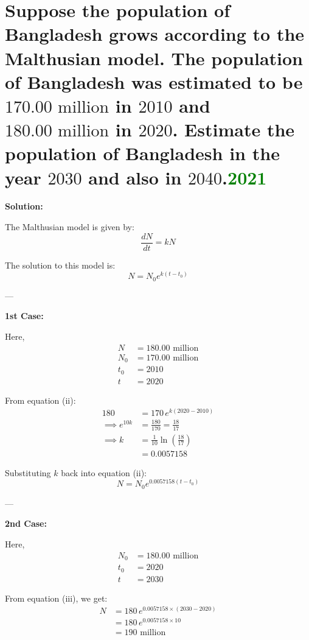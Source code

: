 \section{Suppose the population of Bangladesh grows according to the Malthusian model. The population of Bangladesh was estimated to be $170.00\text{ million}$ in $2010$ and $180.00\text{ million}$ in $2020$. Estimate the population of Bangladesh in the year $2030$ and also in $2040$.\textcolor{green}{2021}}
\textbf{Solution:}

The Malthusian model is given by:
\begin{equation}
    \frac{dN}{dt} = kN \tag{i}
\end{equation}

The solution to this model is:
\begin{equation}
    N = N_0 e^{k(t - t_0)} \tag{ii}
\end{equation}

---

\textbf{1st Case:}

Here,
\begin{align*}
    N &= 180.00 \text{ million} \\
    N_0 &= 170.00 \text{ million} \\
    t_0 &= 2010 \\
    t &= 2020
\end{align*}

From equation (ii):
\begin{align*}
    180 &= 170 \, e^{k(2020 - 2010)} \\
    \implies e^{10k} &= \frac{180}{170} = \frac{18}{17} \\
    \implies k &= \frac{1}{10} \ln\left(\frac{18}{17}\right) \\
    &= 0.0057158
\end{align*}

Substituting $k$ back into equation (ii):
\begin{equation}
    N = N_0 e^{0.0057158(t - t_0)} \tag{iii}
\end{equation}

---

\textbf{2nd Case:}

Here,
\begin{align*}
    N_0 &= 180.00 \text{ million} \\
    t_0 &= 2020 \\
    t &= 2030
\end{align*}

From equation (iii), we get:
\begin{align*}
    N &= 180 \, e^{0.0057158 \times (2030 - 2020)} \\
    &= 180 \, e^{0.0057158 \times 10} \\
    &= 190 \text{ million}
\end{align*}

